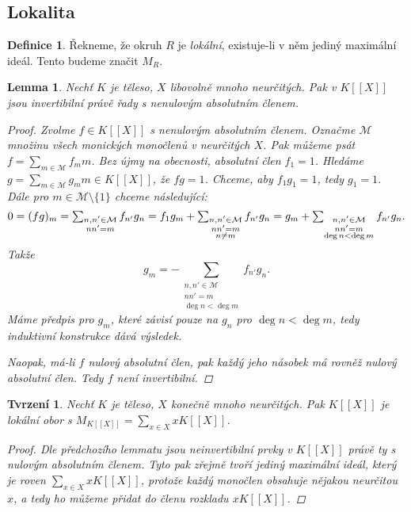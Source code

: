 \documentclass[11pt,a4paper]{article}
\newcommand\p[1]{\mathcal{ #1 }} %
\newcommand*{\ml}[1]{\[\textstyle\let\displaystyle\textstyle#1\]}	%
\newcounter{numb}
\theoremstyle{definition}
\newtheorem*{definice}{Definice}
\theoremstyle{plain}
\newtheorem{lemma}[numb]{Lemma}
\newtheorem{tvrzeni}[numb]{Tvrzení}
\begin{document}
\subsection{Lokalita}

\begin{definice}
	Řekneme, že okruh $R$ je \emph{lokální}, existuje-li v něm jediný maximální ideál. Tento budeme značit $M_R$.
\end{definice}

\begin{lemma} \label{thm:KX_inv}
	Nechť $K$ je těleso, $X$ libovolně mnoho neurčitých. Pak v $K[[X]]$ jsou invertibilní právě řady s nenulovým absolutním členem.

	\begin{proof}
		Zvolme $f \in K[[X]]$ s nenulovým absolutním členem. Označme $\p M$ množinu všech monických monočlenů v neurčitých $X$. Pak můžeme psát $f = \sum_{m \in \p M} f_m m$. Bez újmy na obecnosti, absolutní člen $f_1 = 1$. Hledáme $g = \sum_{m \in \p M} g_m m \in K[[X]]$, že $f g = 1$. Chceme, aby $f_1 g_1 = 1$, tedy $g_1 = 1$. Dále pro $m \in \p M \setminus \{1\}$ chceme následující:
		\ml{
			0 = (f g)_m = \sum_{\substack{n, n' \in \p M\\ n n' = m}} f_{n'} g_n = f_1 g_m + \sum_{\substack{n, n' \in \p M\\ n n' = m\\ n \not= m}} f_{n'} g_n = g_m + \sum_{\substack{n, n' \in \p M\\ n n' = m\\ \deg n < \deg m}} f_{n'} g_n.
		}
		Takže
		\begin{equation*} \label{eq:inv}
			\textstyle
			g_m = -\sum_{\substack{n, n' \in \p M\\ n n' = m\\ \deg n < \deg m}} f_{n'} g_n \tag{$\ast$}.
		\end{equation*}
		Máme předpis pro $g_m$, které závisí pouze na $g_n$ pro $\deg n < \deg m$, tedy induktivní konstrukce dává výsledek.

		Naopak, má-li $f$ nulový absolutní člen, pak každý jeho násobek má rovněž nulový absolutní člen. Tedy $f$ není invertibilní.
	\end{proof}
\end{lemma}

\begin{tvrzeni}
	Nechť $K$ je těleso, $X$ konečně mnoho neurčitých. Pak $K[[X]]$ je lokální obor s $M_{K[[X]]} = \sum_{x \in X} x K[[X]]$.

	\begin{proof}
		Dle předchozího lemmatu jsou neinvertibilní prvky v $K[[X]]$ právě ty s nulovým absolutním členem. Tyto pak zřejmě tvoří jediný maximální ideál, který je roven $\sum_{x \in X} x K[[X]]$, protože každý monočlen obsahuje nějakou neurčitou $x$, a tedy ho můžeme přidat do členu rozkladu $x K[[X]]$.
	\end{proof}
\end{tvrzeni}
\end{document}
